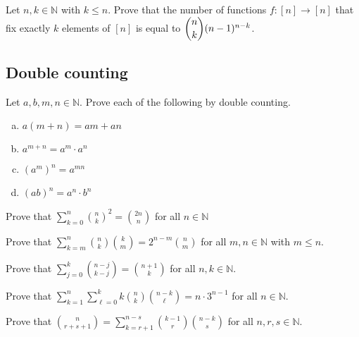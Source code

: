 \begin{chapex}
Let $n,k \in \mathbb{N}$ with $k \le n$. Prove that the number of functions $f : [n] \to [n]$ that fix exactly $k$ elements of $[n]$ is equal to $\dbinom{n}{k}(n-1)^{n-k}$.
\end{chapex}



\subsection*{Double counting}

\begin{chapex}
Let $a,b,m,n \in \mathbb{N}$. Prove each of the following by double counting.
\begin{multicols}{2}
\begin{enumerate}[(a)]
\item $a(m+n) = am + an$
\item $a^{m+n} = a^m \cdot a^n$
\item $(a^m)^n = a^{mn}$
\item $(ab)^n = a^n \cdot b^n$
\end{enumerate}
\end{multicols}
\end{chapex}

\begin{chapex}
Prove that $\displaystyle \sum_{k=0}^n \binom{n}{k}^2 = \binom{2n}{n}$ for all $n \in \mathbb{N}$
\end{chapex}

\begin{chapex}
Prove that $\displaystyle \sum_{k=m}^n \binom{n}{k} \binom{k}{m} = 2^{n-m} \binom{n}{m}$ for all $m,n \in \mathbb{N}$ with $m \le n$.
\end{chapex}

\begin{chapex}
Prove that $\displaystyle \sum_{j=0}^k \binom{n-j}{k-j} = \binom{n+1}{k}$ for all $n,k \in \mathbb{N}$.
\end{chapex}

\begin{chapex}
Prove that $\displaystyle \sum_{k=1}^n \sum_{\ell = 0}^k k \binom{n}{k} \binom{n-k}{\ell} = n \cdot 3^{n-1}$ for all $n \in \mathbb{N}$.
\end{chapex}

\begin{chapex}
Prove that $\displaystyle \binom{n}{r+s+1} = \sum_{k=r+1}^{n-s} \binom{k-1}{r} \binom{n-k}{s}$ for all $n,r,s \in \mathbb{N}$.
\end{chapex}

